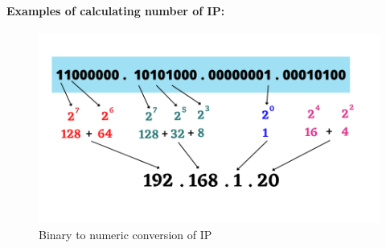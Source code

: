 \begin{flushleft}
\paragraph{Examples of calculating number of IP:}
	\begin{figure}[h!]
	\centering
	\includegraphics[scale=0.6]{content/chapter14/images/example.png}
	\caption{Binary to numeric conversion of IP}
	\label{fig:Ip}
\end{figure}

\end{flushleft}
\newpage


